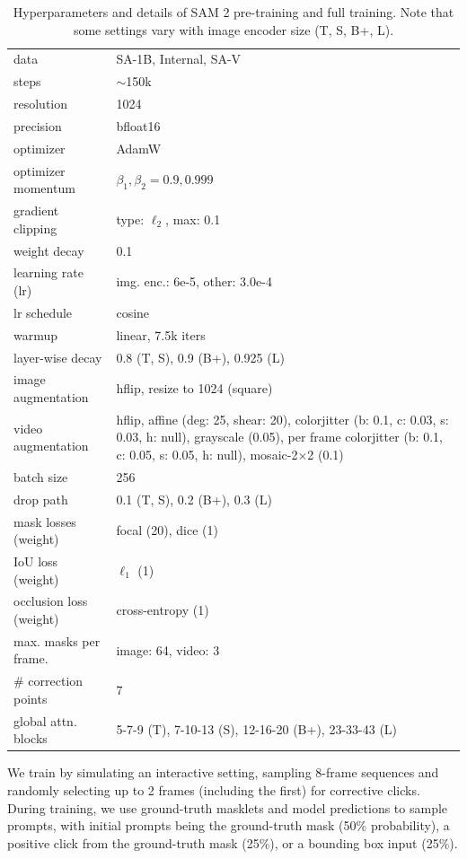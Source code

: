 \documentclass[]{fairmeta}
\begin{document}
\begin{table}[!ht]
{\begin{minipage}{1.0\linewidth}
{\begin{center}
\begin{tabular}{y{120}|x{250}}
data & SA-1B, Internal, SA-V \\
steps & $\sim$150k \\
resolution & 1024 \\
precision & bfloat16 \\
optimizer & AdamW \\
optimizer momentum & {$\beta_1, \beta_2{=}0.9, 0.999$} \\ 
gradient clipping & type: $\ell_2$, max: {0.1} \\
weight decay & 0.1 \\
learning rate (lr) & img. enc.: 6e-5, other: 3.0e-4 \\
lr schedule & cosine\\
warmup & linear, 7.5k iters \\ 
layer-wise decay & 0.8 (T, S), 0.9 (B+), 0.925 (L) \\
image augmentation & hflip, resize to 1024 (square)\\
video augmentation & hflip, affine (deg: 25, shear: 20), colorjitter (b: 0.1, c: 0.03, s: 0.03, h: null), grayscale (0.05), per frame colorjitter (b: 0.1, c: 0.05, s: 0.05, h: null), mosaic-2$\times$2 (0.1) \\
batch size & 256 \\
drop path & 0.1 (T, S), 0.2 (B+), 0.3 (L) \\
mask losses (weight) & focal (20), dice (1)\\
IoU loss (weight) & $\ell_1$ (1)\\
occlusion loss (weight) & cross-entropy (1) \\
max. masks per frame. & image: 64, video: 3 \\
\# correction points & 7 \\
global attn. blocks & 5-7-9 (T), 7-10-13 (S), 12-16-20 (B+), 23-33-43 (L)
\end{tabular}
\end{center}}\end{minipage}
}
\vspace{-5pt}
\caption{Hyperparameters and details of SAM 2 pre-training and full training. Note that some settings vary with image encoder size  (T, S, B+, L).}
\label{tab:hyperparams}
\end{table}


We train by simulating an interactive setting, sampling 8-frame sequences and randomly selecting up to 2 frames (including the first) for corrective clicks. During training, we use ground-truth masklets and model predictions to sample prompts, with initial prompts being the ground-truth mask (50\% probability), a positive click from the ground-truth mask (25\%), or a bounding box input (25\%).
\end{document}
